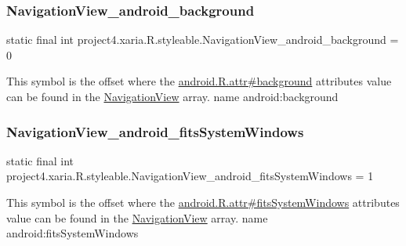 \subsubsection{\texorpdfstring{Navigation\+View\+\_\+android\+\_\+background}{NavigationView\_android\_background}}
{\footnotesize\ttfamily static final int project4.\+xaria.\+R.\+styleable.\+Navigation\+View\+\_\+android\+\_\+background = 0\hspace{0.3cm}{\ttfamily [static]}}

This symbol is the offset where the \hyperlink{}{android.\+R.\+attr\#background} attribute\textquotesingle{}s value can be found in the \hyperlink{classproject4_1_1xaria_1_1R_1_1styleable_a93b7138d1a19f728c4d3933a75ce23e2}{Navigation\+View} array.  name android\+:background \mbox{\label{classproject4_1_1xaria_1_1R_1_1styleable_a3a323e4a98ccce401c1e052c95ff41d0}} 
\subsubsection{\texorpdfstring{Navigation\+View\+\_\+android\+\_\+fits\+System\+Windows}{NavigationView\_android\_fitsSystemWindows}}
{\footnotesize\ttfamily static final int project4.\+xaria.\+R.\+styleable.\+Navigation\+View\+\_\+android\+\_\+fits\+System\+Windows = 1\hspace{0.3cm}{\ttfamily [static]}}

This symbol is the offset where the \hyperlink{}{android.\+R.\+attr\#fits\+System\+Windows} attribute\textquotesingle{}s value can be found in the \hyperlink{classproject4_1_1xaria_1_1R_1_1styleable_a93b7138d1a19f728c4d3933a75ce23e2}{Navigation\+View} array.  name android\+:fits\+System\+Windows \mbox{\label{classproject4_1_1xaria_1_1R_1_1styleable_a5a8dc1c5c2c90070efa716ca76e55965}} 
